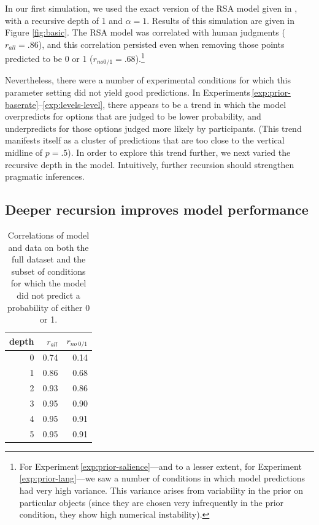 \documentclass[man,noapacite]{apa2}
\newcounter{Experiment}
\newcommand{\exptref}[1]{Experiment\,\ref{#1}}
\newcommand{\exptrefrange}[2]{Experiments\,\ref{#1}--\ref{#2}}
\begin{document}
In our first simulation, we used the exact version of the RSA model given in , with a recursive depth of 1 and $\alpha=1$. Results of this simulation are given in Figure \ref{fig:basic}. The RSA model was correlated with human judgments ($r_{all} = .86$), and this correlation persisted even when removing those points predicted to be 0 or 1 ($r_{no 0/1} = .68$).\footnote{For \exptref{exp:prior-salience}---and to a lesser extent, for \exptref{exp:prior-lang}---we saw a number of conditions in which model predictions had very high variance. This variance arises from variability in the prior on particular objects (since they are chosen very infrequently in the prior condition, they show high numerical instability).}

Nevertheless, there were a number of experimental conditions for which this parameter setting did not yield good predictions. In \exptrefrange{exp:prior-baserate}{exp:levels-level}, there appears to be a trend in which the model overpredicts for options that are judged to be lower probability, and underpredicts for those options judged more likely by participants. (This trend manifests itself as a cluster of predictions that are too close to the vertical midline of $p=.5$). In order to explore this trend further, we next varied the recursive depth in the model. Intuitively, further recursion should strengthen pragmatic inferences.

\subsection{Deeper recursion improves model performance}

\begin{table}[ht]
\centering
\begin{tabular}{rrr}
  \hline
depth & $r_{all}$ & $r_{no~0/1}$ \\
  \hline
  0 & 0.74 & 0.14 \\
    1 & 0.86 & 0.68 \\
    2 & 0.93 & 0.86 \\
    3 & 0.95 & 0.90 \\
    4 & 0.95 & 0.91 \\
    5 & 0.95 & 0.91 \\
   \hline
\end{tabular}
\caption{\label{tab:corr-a1} Correlations of model and data on both the full dataset and the subset of conditions for which the model did not predict a probability of either 0 or 1.}
\end{table}
\end{document}
